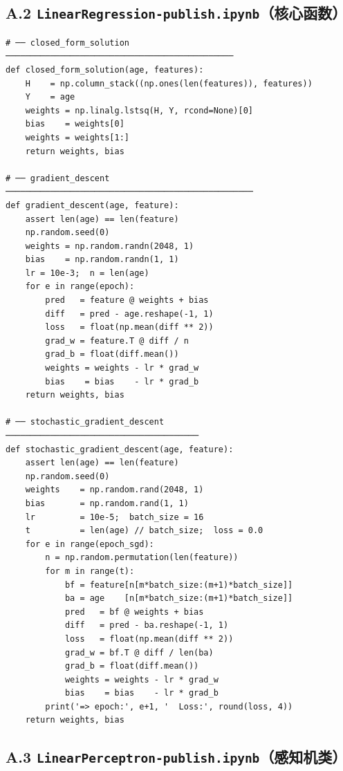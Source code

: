 \documentclass[12pt,a4paper]{ctexart}
\begin{document}
\subsection*{A.2 \texttt{LinearRegression-publish.ipynb}（核心函数）}

\begin{lstlisting}
# ── closed_form_solution ──────────────────────────────────────────────
def closed_form_solution(age, features):
    H    = np.column_stack((np.ones(len(features)), features))
    Y    = age
    weights = np.linalg.lstsq(H, Y, rcond=None)[0]
    bias    = weights[0]
    weights = weights[1:]
    return weights, bias

# ── gradient_descent ──────────────────────────────────────────────────
def gradient_descent(age, feature):
    assert len(age) == len(feature)
    np.random.seed(0)
    weights = np.random.randn(2048, 1)
    bias    = np.random.randn(1, 1)
    lr = 10e-3;  n = len(age)
    for e in range(epoch):
        pred   = feature @ weights + bias
        diff   = pred - age.reshape(-1, 1)
        loss   = float(np.mean(diff ** 2))
        grad_w = feature.T @ diff / n
        grad_b = float(diff.mean())
        weights = weights - lr * grad_w
        bias    = bias    - lr * grad_b
    return weights, bias

# ── stochastic_gradient_descent ───────────────────────────────────────
def stochastic_gradient_descent(age, feature):
    assert len(age) == len(feature)
    np.random.seed(0)
    weights    = np.random.rand(2048, 1)
    bias       = np.random.rand(1, 1)
    lr         = 10e-5;  batch_size = 16
    t          = len(age) // batch_size;  loss = 0.0
    for e in range(epoch_sgd):
        n = np.random.permutation(len(feature))
        for m in range(t):
            bf = feature[n[m*batch_size:(m+1)*batch_size]]
            ba = age    [n[m*batch_size:(m+1)*batch_size]]
            pred   = bf @ weights + bias
            diff   = pred - ba.reshape(-1, 1)
            loss   = float(np.mean(diff ** 2))
            grad_w = bf.T @ diff / len(ba)
            grad_b = float(diff.mean())
            weights = weights - lr * grad_w
            bias    = bias    - lr * grad_b
        print('=> epoch:', e+1, '  Loss:', round(loss, 4))
    return weights, bias
\end{lstlisting}

\subsection*{A.3 \texttt{LinearPerceptron-publish.ipynb}（感知机类）}
\end{document}
